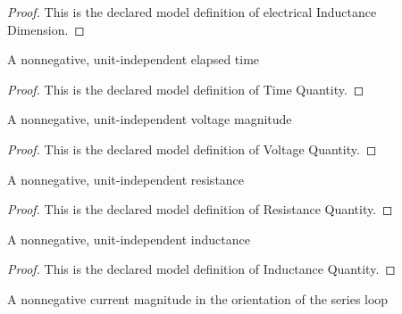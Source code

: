 \begin{proof}
  This is the declared model definition of electrical Inductance Dimension.
\end{proof}
\begin{definition}
  \label{def:physics:phyx-mini-0989:phyxminiproblems-problemphyxmini0989-timequantity}
  A nonnegative, unit-independent elapsed time
\end{definition}
\begin{proof}
  This is the declared model definition of Time Quantity.
\end{proof}
\begin{definition}
  \label{def:physics:phyx-mini-0989:phyxminiproblems-problemphyxmini0989-voltagequantity}
  A nonnegative, unit-independent voltage magnitude
\end{definition}
\begin{proof}
  This is the declared model definition of Voltage Quantity.
\end{proof}
\begin{definition}
  \label{def:physics:phyx-mini-0989:phyxminiproblems-problemphyxmini0989-resistancequantity}
  A nonnegative, unit-independent resistance
\end{definition}
\begin{proof}
  This is the declared model definition of Resistance Quantity.
\end{proof}
\begin{definition}
  \label{def:physics:phyx-mini-0989:phyxminiproblems-problemphyxmini0989-inductancequantity}
  A nonnegative, unit-independent inductance
\end{definition}
\begin{proof}
  This is the declared model definition of Inductance Quantity.
\end{proof}
\begin{definition}
  \label{def:physics:phyx-mini-0989:phyxminiproblems-problemphyxmini0989-electriccurrentquantity}
  A nonnegative current magnitude in the orientation of the series loop
\end{definition}
